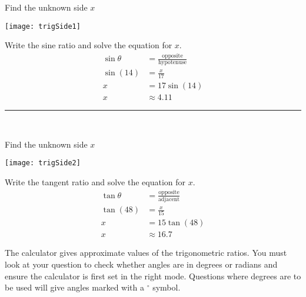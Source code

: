 \begin{multicols}{2}
	\example Find the unknown side $x$\\
	\begin{center}
		\texttt{[image: trigSide1]}
	\end{center}

	\columnbreak
\solution Write the sine ratio and solve the equation for $x$.\\
\begin{align*}
\sin\theta &=\frac{\text{opposite}}{\text{hypotenuse}}\\
\sin (14) &= \frac{x}{17}\\
x&=17\sin(14)\\
x&\approx4.11\end{align*}
\end{multicols}
\rule{6.8cm}{0.5pt}\\
\begin{multicols}{2}
\example Find the unknown side $x$\\
\begin{center}
	\texttt{[image: trigSide2]}
\end{center}
	\columnbreak
\solution Write the tangent ratio and solve the equation for $x$.
\begin{align*}
\tan\theta &=\frac{\text{opposite}}{\text{adjacent}}\\
\tan(48) &= \frac{x}{15}\\
x&=15\tan(48)\\
x&\approx 16.7\end{align*}
\end{multicols}
The calculator gives approximate values of the trigonometric ratios. You must look at your question to check whether angles are in degrees or radians and ensure the calculator is first set in the right mode. Questions where degrees are to be used will give angles marked with a $^\circ$ symbol. 

